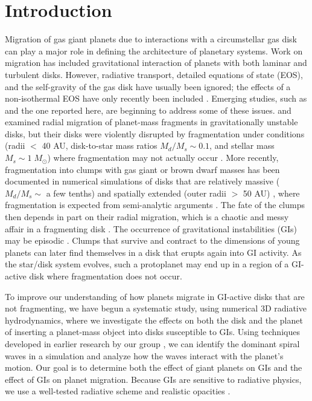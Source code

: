 \documentclass[12pt,manuscript,authoryear]{aastex}
\begin{document}
\label{firstpage}

\section{Introduction}

Migration of gas giant planets due to interactions with a circumstellar gas disk can play a major role in defining the architecture of planetary systems. Work on migration \citep[see review by][]{papaloizou2007} has included gravitational interaction of planets with both laminar and turbulent disks. However, radiative transport, detailed equations of state (EOS), and the self-gravity of the gas disk have usually been ignored; the effects of a non-isothermal EOS have only recently been included \citep[e.g.,][]{paardekooper2006,paardekooper2010,paardekooper2011}. Emerging studies, such as \citet{baruteau2011} and the one reported here, are beginning to address some of these issues. 
\citet{boss2005} and \citet{mayer2004} examined radial migration of planet-mass fragments in gravitationally unstable disks, but their disks were violently disrupted by fragmentation under conditions (radii $<$ 40 AU, disk-to-star mass ratios $M_d/M_s \sim 0.1$, and stellar mass $M_s \sim 1\;M_{\odot}$) where fragmentation may not actually occur  \citep{rafikov2005,rafikov2007,boley2006,boley2007b,boley2008,forgan2009,cai2010}. More recently, fragmentation into clumps with gas giant or brown dwarf masses has been documented in numerical simulations of disks that are relatively massive ($M_d/M_s \sim$ a few tenths) and spatially extended (outer radii $>$ 50 AU) \citep{krumholz2007,stamatellos2007,stamatellos2009,boley2009,boley2010}, where fragmentation is expected from semi-analytic arguments \citep[e.g.,][]{clarke2009,rafikov2009,dodson2009}. The fate of the clumps then depends in part on their radial migration, which is a chaotic and messy affair in a fragmenting disk \citep[e.g.,][]{boley2009,boley2010,vorobyov2010,boley2010b}. The occurrence of gravitational instabilities (GIs) may be episodic \citep[e.g.,][]{vorobyov2006,vorobyov2010b,zhu2010}. Clumps that survive and contract to the dimensions of young planets can later find themselves in a disk that erupts again into GI activity. As the star/disk system evolves, such a protoplanet may end up in a region of a GI-active disk where fragmentation does not occur.

To improve our understanding of how planets migrate in GI-active disks that are not fragmenting, we have begun a systematic study, using numerical 3D radiative hydrodynamics, where we investigate the effects on both the disk and the planet of inserting a planet-mass object into disks susceptible to GIs. Using techniques developed in earlier research by our group \citep{pickett2003, mejia2005,cai2006,cai2008,boley2006,boley2007b,michael2010}, we can identify the dominant spiral waves in a simulation and analyze how the waves interact with the planet's motion. Our goal is to determine both the effect of giant planets on GIs and the effect of GIs on planet migration. Because GIs are sensitive to radiative physics, we use a well-tested radiative scheme \citep{boley2007b} and realistic opacities \citep{dalessio2001}. 
\end{document}
